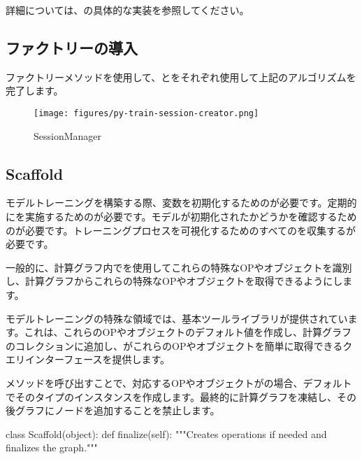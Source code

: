 \begin{content}
\begin{enum}
\end{enum}

詳細については、の具体的な実装を参照してください。

\subsection{ファクトリーの導入}

ファクトリーメソッドを使用して、とをそれぞれ使用して上記のアルゴリズムを完了します。

\begin{figure}[!htbp]
\centering
\texttt{[image: figures/py-train-session-creator.png]}
\caption{SessionManager}
 \label{fig:py-train-session-creator}
\end{figure}

\subsection{Scaffold}

モデルトレーニングを構築する際、変数を初期化するためのが必要です。定期的にを実施するためのが必要です。モデルが初期化されたかどうかを確認するためのが必要です。トレーニングプロセスを可視化するためのすべてのを収集するが必要です。

一般的に、計算グラフ内でを使用してこれらの特殊なOPやオブジェクトを識別し、計算グラフからこれらの特殊なOPやオブジェクトを取得できるようにします。

モデルトレーニングの特殊な領域では、基本ツールライブラリが提供されています。これは、これらのOPやオブジェクトのデフォルト値を作成し、計算グラフのコレクションに追加し、がこれらのOPやオブジェクトを簡単に取得できるクエリインターフェースを提供します。

メソッドを呼び出すことで、対応するOPやオブジェクトがの場合、デフォルトでそのタイプのインスタンスを作成します。最終的に計算グラフを凍結し、その後グラフにノードを追加することを禁止します。

\begin{leftbar}
\begin{python}
class Scaffold(object):
  def finalize(self):
    """Creates operations if needed and finalizes the graph."""
    

\end{python}
\end{leftbar}
\end{content}

